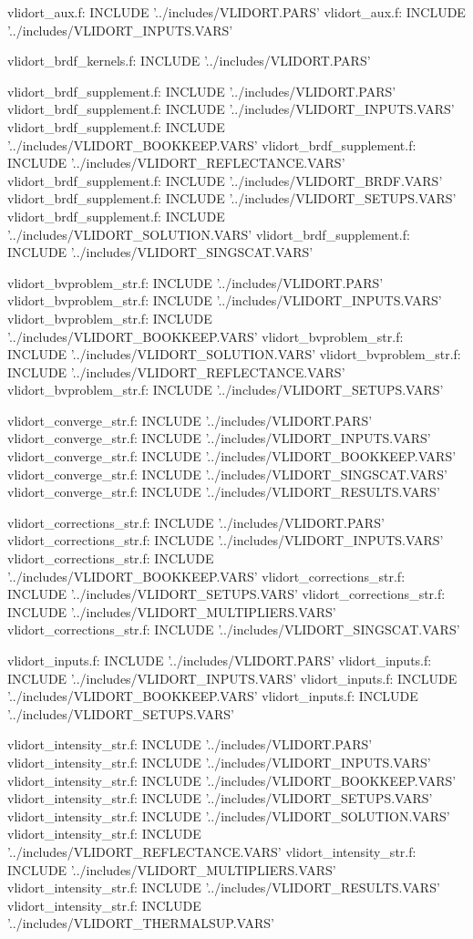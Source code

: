 vlidort_aux.f:      INCLUDE '../includes/VLIDORT.PARS'
vlidort_aux.f:      INCLUDE '../includes/VLIDORT_INPUTS.VARS'

vlidort_brdf_kernels.f:      INCLUDE '../includes/VLIDORT.PARS'

vlidort_brdf_supplement.f:      INCLUDE '../includes/VLIDORT.PARS'
vlidort_brdf_supplement.f:      INCLUDE '../includes/VLIDORT_INPUTS.VARS'
vlidort_brdf_supplement.f:      INCLUDE '../includes/VLIDORT_BOOKKEEP.VARS'
vlidort_brdf_supplement.f:      INCLUDE '../includes/VLIDORT_REFLECTANCE.VARS'
vlidort_brdf_supplement.f:      INCLUDE '../includes/VLIDORT_BRDF.VARS'
vlidort_brdf_supplement.f:      INCLUDE '../includes/VLIDORT_SETUPS.VARS'
vlidort_brdf_supplement.f:      INCLUDE '../includes/VLIDORT_SOLUTION.VARS'
vlidort_brdf_supplement.f:      INCLUDE '../includes/VLIDORT_SINGSCAT.VARS'

vlidort_bvproblem_str.f:      INCLUDE '../includes/VLIDORT.PARS'
vlidort_bvproblem_str.f:      INCLUDE '../includes/VLIDORT_INPUTS.VARS'
vlidort_bvproblem_str.f:      INCLUDE '../includes/VLIDORT_BOOKKEEP.VARS'
vlidort_bvproblem_str.f:      INCLUDE '../includes/VLIDORT_SOLUTION.VARS'
vlidort_bvproblem_str.f:      INCLUDE '../includes/VLIDORT_REFLECTANCE.VARS'
vlidort_bvproblem_str.f:      INCLUDE '../includes/VLIDORT_SETUPS.VARS'

vlidort_converge_str.f:      INCLUDE '../includes/VLIDORT.PARS'
vlidort_converge_str.f:      INCLUDE '../includes/VLIDORT_INPUTS.VARS'
vlidort_converge_str.f:      INCLUDE '../includes/VLIDORT_BOOKKEEP.VARS'
vlidort_converge_str.f:      INCLUDE '../includes/VLIDORT_SINGSCAT.VARS'
vlidort_converge_str.f:      INCLUDE '../includes/VLIDORT_RESULTS.VARS'

vlidort_corrections_str.f:      INCLUDE '../includes/VLIDORT.PARS'
vlidort_corrections_str.f:      INCLUDE '../includes/VLIDORT_INPUTS.VARS'
vlidort_corrections_str.f:      INCLUDE '../includes/VLIDORT_BOOKKEEP.VARS'
vlidort_corrections_str.f:      INCLUDE '../includes/VLIDORT_SETUPS.VARS'
vlidort_corrections_str.f:      INCLUDE '../includes/VLIDORT_MULTIPLIERS.VARS'
vlidort_corrections_str.f:      INCLUDE '../includes/VLIDORT_SINGSCAT.VARS'

vlidort_inputs.f:      INCLUDE '../includes/VLIDORT.PARS'
vlidort_inputs.f:      INCLUDE '../includes/VLIDORT_INPUTS.VARS'
vlidort_inputs.f:      INCLUDE '../includes/VLIDORT_BOOKKEEP.VARS'
vlidort_inputs.f:      INCLUDE '../includes/VLIDORT_SETUPS.VARS'

vlidort_intensity_str.f:      INCLUDE '../includes/VLIDORT.PARS'
vlidort_intensity_str.f:      INCLUDE '../includes/VLIDORT_INPUTS.VARS'
vlidort_intensity_str.f:      INCLUDE '../includes/VLIDORT_BOOKKEEP.VARS'
vlidort_intensity_str.f:      INCLUDE '../includes/VLIDORT_SETUPS.VARS'
vlidort_intensity_str.f:      INCLUDE '../includes/VLIDORT_SOLUTION.VARS'
vlidort_intensity_str.f:      INCLUDE '../includes/VLIDORT_REFLECTANCE.VARS'
vlidort_intensity_str.f:      INCLUDE '../includes/VLIDORT_MULTIPLIERS.VARS'
vlidort_intensity_str.f:      INCLUDE '../includes/VLIDORT_RESULTS.VARS'
vlidort_intensity_str.f:      INCLUDE '../includes/VLIDORT_THERMALSUP.VARS'

